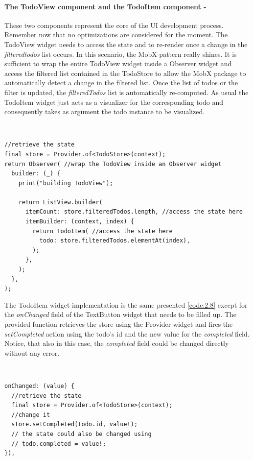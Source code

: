 \paragraph{The TodoView component and the TodoItem component - }
\label{subpar:todo_app_bloc_core_state} These two components represent the core of the UI development process. Remember now that no optimizations are considered for the moment. The TodoView widget needs to access the state and to re-render once a change in the \textit{filteredtodos} list occurs. In this scenario, the MobX pattern really shines. It is sufficient to wrap the entire TodoView widget inside a Observer widget and access the filtered list contained in the TodoStore to allow the MobX package to automatically detect a change in the filtered list. Once the list of todos or the filter is updated, the \textit{filteredTodos} list is automatically re-computed. As usual the TodoItem widget just acts as a visualizer for the corresponding todo and consequently takes as argument the todo instance to be visualized.
\begin{code}
\mbox{}\\
 \mbox{}
		\label{code:2.14}
\begin{verbatim}
//retrieve the state
final store = Provider.of<TodoStore>(context);
return Observer( //wrap the TodoView inside an Observer widget
  builder: (_) {
    print("building TodoView");

    return ListView.builder(
      itemCount: store.filteredTodos.length, //access the state here
      itemBuilder: (context, index) {
        return TodoItem( //access the state here
          todo: store.filteredTodos.elementAt(index),
        );
      },
    );
  },
);
\end{verbatim}
\mbox{}
\end{code}

The TodoItem widget implementation is the same presented \ref{code:2.8} except for the \textit{onChanged} field of the TextButton widget that needs to be filled up. The provided function retrieves the store using the Provider widget and fires the \textit{setCompleted }action using the todo’s id and the new value for the \textit{completed} field. Notice, that also in this case, the \textit{completed} field could be changed directly without any error.
\begin{code}
\mbox{}\\
 \mbox{}
		\label{code:2.14}
\begin{verbatim}
onChanged: (value) {
  //retrieve the state
  final store = Provider.of<TodoStore>(context);
  //change it
  store.setCompleted(todo.id, value!);
  // the state could also be changed using
  // todo.completed = value!;
}),
\end{verbatim}
\mbox{}
\end{code}


